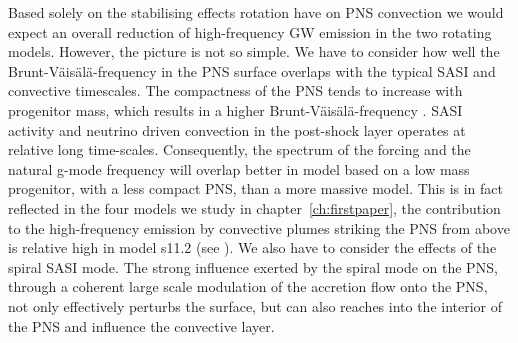 Based solely on the stabilising effects rotation have on PNS convection we would expect an overall 
reduction of high-frequency GW emission in the two rotating models. However, the picture is not
so simple. We have to consider how well the Brunt-V\"{a}is\"{a}l\"{a}-frequency in the PNS surface overlaps with
the typical SASI and convective timescales. The compactness of the PNS tends to increase with
progenitor mass, which results in a higher Brunt-V\"{a}is\"{a}l\"{a}-frequency \citep{mueller_13}.
SASI activity and neutrino driven convection in the post-shock layer operates at relative long time-scales.
Consequently, the spectrum of the forcing and the natural g-mode frequency will overlap better
in model based on a low mass progenitor, with a less compact PNS, than a more massive model. 
This is in fact reflected in the four models we study in chapter~\ref{ch:firstpaper},
the contribution to the high-frequency emission by convective plumes striking the PNS from above
is relative high in model s11.2 (see ).
We also have to consider the effects of the spiral SASI mode.
The strong influence exerted by the spiral mode on the PNS, through a coherent large scale
modulation of the accretion flow onto the PNS, not only effectively perturbs the surface, 
but can also reaches into the interior of the PNS and influence the convective layer.


